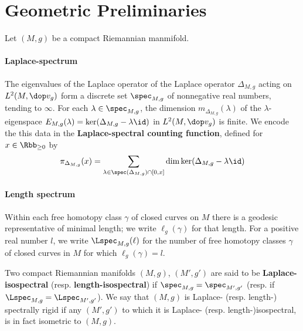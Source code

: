 \section{Geometric Preliminaries}
Let $(M,g)$ be a compact Riemannian manmifold.
\paragraph{Laplace-spectrum}
The eigenvalues of the Laplace operator of the Laplace operator $\Delta_{M,g}$ acting on $L^2(M,\dop v_g)$ form a discrete set $\spec_{M,g}$ of nonnegative real numbers, tending to $\infty$. For each $\lambda \in \spec_{M,g}$, the dimension $m_{\Delta_{M,g}}(\lambda)$ of the $\lambda$-eigenspace $E_{M,g}(\lambda)=\ker (\Delta_{M,g}- \lambda \id)$ in $L^2(M, \dop v_g)$ is finite. We encode the this data in the \textbf{Laplace-spectral counting function}, defined for $x\in \Rbb_{\geq 0}$ by
\begin{align}
  \pi_{\Delta_{M,g}}(x) = \sum_{\lambda \in \spec(\Delta_{M,g}) \cap [0,x]} \dim \ker (\Delta_{M,g} - \lambda \id )
\end{align}


\paragraph{Length spectrum}
Within each free homotopy class $\gamma$ of closed curves on $M$ there is a geodesic representative of minimal length; we write $\ell_g(\gamma)$ for that length. For a positive real number $l$, we write $\Lspec_{M,g}(\ell)$ for the number of free homotopy classes $\gamma$ of closed curves in $M$ for which $\ell_g(\gamma) = l$.


Two compact Riemannian manifolds $(M,g)$, $(M',g')$  are said to be \textbf{Laplace-isospectral} (resp. \textbf{length-isospectral})  if $\spec_{M,g} = \spec_{M',g'}$ (resp.  if $\Lspec_{M,g}=\Lspec_{M',g'}$). We say that $(M,g)$ is Laplace- (resp. length-) spectrally rigid if any $(M',g')$ to which it is Laplace- (resp. length-)isospectral, is in fact isometric to $(M,g)$.

